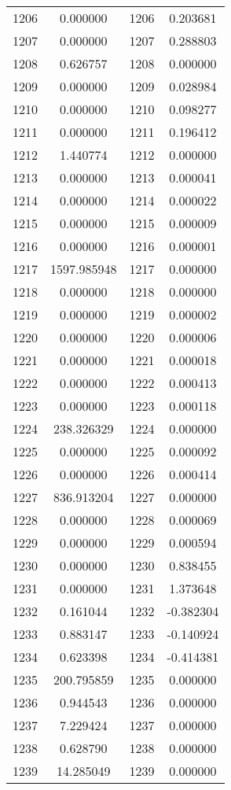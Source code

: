 \documentclass[12pt]{article}
\begin{document}
\begin{longtable}{@{}cccc@{}}
1206 & 0.000000 & 1206 & 0.203681 \\
1207 & 0.000000 & 1207 & 0.288803 \\
1208 & 0.626757 & 1208 & 0.000000 \\
1209 & 0.000000 & 1209 & 0.028984 \\
1210 & 0.000000 & 1210 & 0.098277 \\
1211 & 0.000000 & 1211 & 0.196412 \\
1212 & 1.440774 & 1212 & 0.000000 \\
1213 & 0.000000 & 1213 & 0.000041 \\
1214 & 0.000000 & 1214 & 0.000022 \\
1215 & 0.000000 & 1215 & 0.000009 \\
1216 & 0.000000 & 1216 & 0.000001 \\
1217 & 1597.985948 & 1217 & 0.000000 \\
1218 & 0.000000 & 1218 & 0.000000 \\
1219 & 0.000000 & 1219 & 0.000002 \\
1220 & 0.000000 & 1220 & 0.000006 \\
1221 & 0.000000 & 1221 & 0.000018 \\
1222 & 0.000000 & 1222 & 0.000413 \\
1223 & 0.000000 & 1223 & 0.000118 \\
1224 & 238.326329 & 1224 & 0.000000 \\
1225 & 0.000000 & 1225 & 0.000092 \\
1226 & 0.000000 & 1226 & 0.000414 \\
1227 & 836.913204 & 1227 & 0.000000 \\
1228 & 0.000000 & 1228 & 0.000069 \\
1229 & 0.000000 & 1229 & 0.000594 \\
1230 & 0.000000 & 1230 & 0.838455 \\
1231 & 0.000000 & 1231 & 1.373648 \\
1232 & 0.161044 & 1232 & -0.382304 \\
1233 & 0.883147 & 1233 & -0.140924 \\
1234 & 0.623398 & 1234 & -0.414381 \\
1235 & 200.795859 & 1235 & 0.000000 \\
1236 & 0.944543 & 1236 & 0.000000 \\
1237 & 7.229424 & 1237 & 0.000000 \\
1238 & 0.628790 & 1238 & 0.000000 \\
1239 & 14.285049 & 1239 & 0.000000 \\

\end{longtable}
\end{document}
